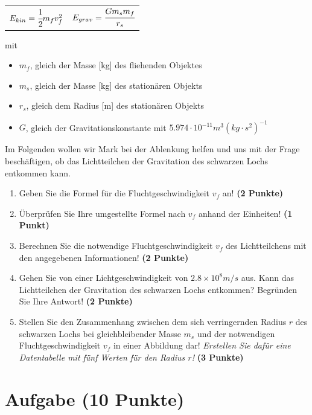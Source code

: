 \documentclass[a4paper, 9pt]{scrartcl}\usepackage[]{graphicx}\usepackage[]{xcolor}
\begin{document}
\begin{center}
  \begin{tabular}{cc}
    $E_{kin} = \cfrac{1}{2}m_fv_f^2$ & $E_{grav} = \cfrac{Gm_sm_f}{r_s}$\\
  \end{tabular}
\end{center}

mit

\begin{itemize}[noitemsep]
\item $m_f$, gleich der Masse [kg] des fliehenden Objektes
\item $m_s$, gleich der Masse [kg] des stationären Objekts
\item $r_s$, gleich dem Radius [m] des stationären Objekts  
\item $G$, gleich der Gravitationskonstante mit $5.974 \cdot 10^{-11} m^3(kg \cdot s^2)^{-1}$ 
\end{itemize}

Im Folgenden wollen wir Mark bei der Ablenkung helfen und uns mit der Frage beschäftigen, ob das Lichtteilchen der Gravitation des schwarzen Lochs entkommen kann.

\begin{enumerate}
\item Geben Sie die Formel für die Fluchtgeschwindigkeit $v_f$ an! \textbf{(2 Punkte)}
\item Überprüfen Sie Ihre umgestellte Formel nach $v_f$ anhand der Einheiten! \textbf{(1 Punkt)} 
\item Berechnen Sie die notwendige Fluchtgeschwindigkeit $v_f$ des Lichtteilchens mit den angegebenen Informationen! \textbf{(2 Punkte)}
\item Gehen Sie von einer Lichtgeschwindigkeit von $\ensuremath{2.8\times 10^{8}}m/s$ aus. Kann das Lichtteilchen der Gravitation des schwarzen Lochs entkommen? Begründen Sie Ihre Antwort! \textbf{(2 Punkte)}
\item Stellen Sie den Zusammenhang zwischen dem sich verringernden Radius $r$ des schwarzen Lochs bei gleichbleibender Masse $m_s$ und der notwendigen Fluchtgeschwindigkeit $v_f$ in einer Abbildung dar! \textit{Erstellen Sie dafür eine Datentabelle mit fünf Werten für den Radius $r$!} \textbf{(3 Punkte)}
\end{enumerate}

 
\clearpage

\section{Aufgabe \hfill (10 Punkte)}
\end{document}
